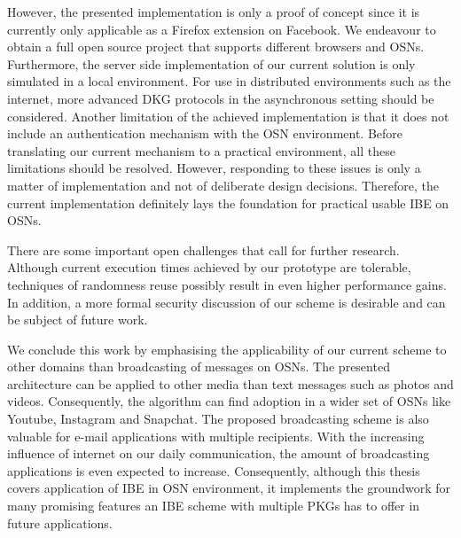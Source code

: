 However, the presented implementation is only a proof of concept since it is currently only applicable as a Firefox extension on Facebook. We endeavour to obtain a full open source project that supports different browsers and OSNs. Furthermore, the server side implementation of our current solution is only simulated in a local environment. For use in distributed environments such as the internet, more advanced DKG protocols in the asynchronous setting should be considered. Another limitation of the achieved implementation is that it does not include an authentication mechanism with the OSN environment. Before translating our current mechanism to a practical environment, all these limitations should be resolved. However, responding to these issues is only a matter of implementation and not of deliberate design decisions. Therefore, the current implementation definitely lays the foundation for practical usable IBE on OSNs. 

There are some important open challenges that call for further research. Although current execution times achieved by our prototype are tolerable, techniques of randomness reuse possibly result in even higher performance gains. In addition, a more formal security discussion of our scheme is desirable and can be subject of future work.

We conclude this work by emphasising the applicability of our current scheme to other domains than broadcasting of messages on OSNs. The presented architecture can be applied to other media than text messages such as photos and videos. Consequently, the algorithm can find adoption in a wider set of OSNs like Youtube, Instagram and Snapchat. The proposed broadcasting scheme is also valuable for e-mail applications with multiple recipients. With the increasing influence of internet on our daily communication, the amount of broadcasting applications is even expected to increase. Consequently, although this thesis covers application of IBE in OSN environment, it implements the groundwork for many promising features an IBE scheme with multiple PKGs has to offer in future applications.



